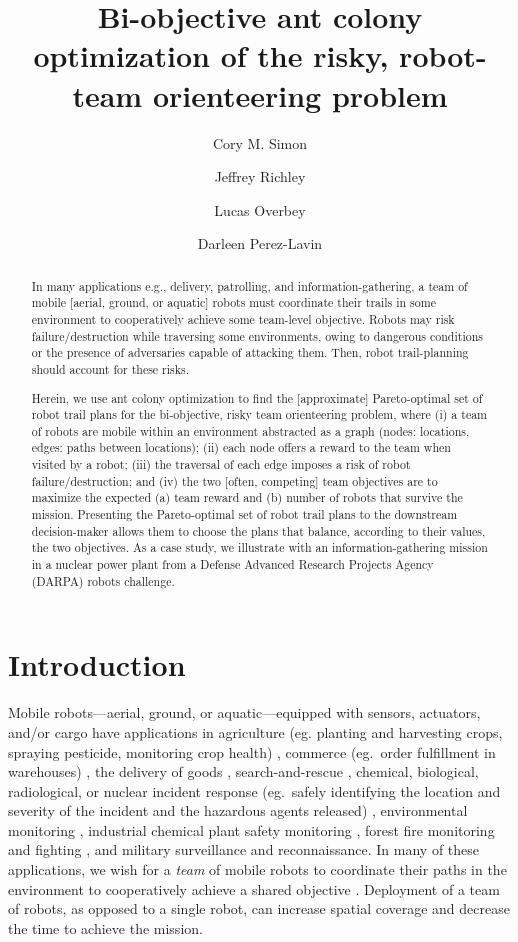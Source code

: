 \documentclass[11pt, oneside]{article}
\title{Bi-objective ant colony optimization of the risky, robot-team orienteering problem}
\author[1]{Cory M. Simon}
\author[2]{Jeffrey Richley}
\author[2]{Lucas Overbey}
\author[2]{Darleen Perez-Lavin}
\affil[1]{School of Chemical, Biological, and Environmental Engineering. Oregon State University. Corvallis, OR. USA.}
\affil[2]{Naval Information Warfare Center Atlantic. Charleston, SC. USA.}
\begin{document}
\maketitle

\begin{abstract}
In many applications e.g., delivery, patrolling, and information-gathering, a team of mobile [aerial, ground, or aquatic] robots must coordinate their trails in some environment to cooperatively achieve some team-level objective. 
Robots may risk failure/destruction while traversing some environments, owing to dangerous conditions or the presence of adversaries capable of attacking them. 
Then, robot trail-planning should account for these risks.

Herein, we use ant colony optimization to find the [approximate] Pareto-optimal set of robot trail plans for the bi-objective, risky team orienteering problem, where (i) a team of robots are mobile within an environment abstracted as a graph (nodes: locations, edges: paths between locations); (ii) each node offers a reward to the team when visited by a robot; (iii) the traversal of each edge imposes a risk of robot failure/destruction; and (iv) the two [often, competing] team objectives are to maximize the expected (a) team reward and (b) number of robots that survive the mission.
Presenting the Pareto-optimal set of robot trail plans to the downstream decision-maker allows them to choose the plans that balance, according to their values, the two objectives. 
As a case study, we illustrate with an information-gathering mission in a nuclear power plant from a Defense Advanced Research Projects Agency (DARPA) robots challenge.
\end{abstract}

\clearpage

\section{Introduction}
Mobile robots---aerial, ground, or aquatic---equipped with sensors, actuators, and/or cargo have applications in agriculture (eg.
 planting and harvesting crops, spraying pesticide, monitoring crop health) \cite{santos2020path}, commerce (eg.\ order fulfillment in warehouses) \cite{wurman2008coordinating}, the delivery of goods \cite{coelho2014thirty}, search-and-rescue \cite{queralta2020collaborative}, chemical, biological, radiological, or nuclear incident response (eg.\ safely identifying the location and severity of the incident and the hazardous agents released) \cite{murphy2012projected}, environmental monitoring \cite{dunbabin2012robots}, industrial chemical plant safety monitoring \cite{soldan2014towards}, forest fire monitoring and fighting \cite{merino2012unmanned}, and military surveillance and reconnaissance. 
In many of these applications, we wish for a \emph{team} of mobile robots to coordinate their paths in the environment to cooperatively achieve a shared objective \cite{parker2007distributed,lesser1999cooperative}.
Deployment of a team of robots, as opposed to a single robot, can increase spatial coverage and decrease the time to achieve the mission. 
\end{document}
